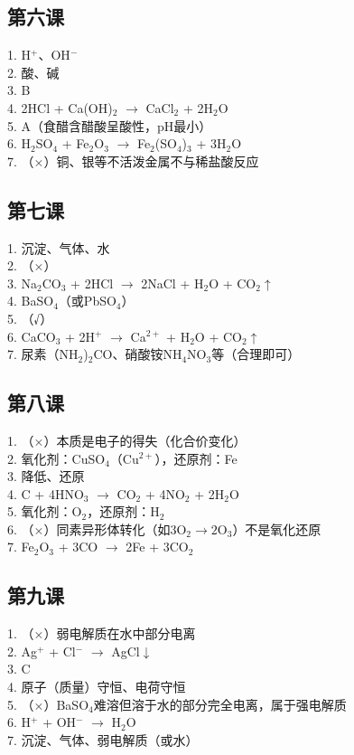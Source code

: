 \documentclass[a4paper,12pt]{ctexart}
\begin{document}
\subsection*{第六课}
1. H$^+$、OH$^-$\\
2. 酸、碱\\
3. B\\
4. 2HCl + Ca(OH)$_2$ $\rightarrow$ CaCl$_2$ + 2H$_2$O\\
5. A（食醋含醋酸呈酸性，pH最小）\\
6. H$_2$SO$_4$ + Fe$_2$O$_3$ $\rightarrow$ Fe$_2$(SO$_4$)$_3$ + 3H$_2$O\\
7. （×）铜、银等不活泼金属不与稀盐酸反应

\subsection*{第七课}
1. 沉淀、气体、水\\
2. （×）\\
3. Na$_2$CO$_3$ + 2HCl $\rightarrow$ 2NaCl + H$_2$O + CO$_2$$\uparrow$\\
4. BaSO$_4$（或PbSO$_4$）\\
5. （√）\\
6. CaCO$_3$ + 2H$^+$ $\rightarrow$ Ca$^{2+}$ + H$_2$O + CO$_2$$\uparrow$\\
7. 尿素（NH$_2$)$_2$CO、硝酸铵NH$_4$NO$_3$等（合理即可）

\subsection*{第八课}
1. （×）本质是电子的得失（化合价变化）\\
2. 氧化剂：CuSO$_4$（Cu$^{2+}$），还原剂：Fe\\
3. 降低、还原\\
4. C + 4HNO$_3$ $\rightarrow$ CO$_2$ + 4NO$_2$ + 2H$_2$O\\
5. 氧化剂：O$_2$，还原剂：H$_2$\\
6. （×）同素异形体转化（如$3\text{O}_2 \rightarrow 2\text{O}_3$）不是氧化还原\\
7. Fe$_2$O$_3$ + 3CO $\rightarrow$ 2Fe + 3CO$_2$

\subsection*{第九课}
1. （×）弱电解质在水中部分电离\\
2. Ag$^+$ + Cl$^-$ $\rightarrow$ AgCl$\downarrow$\\
3. C\\
4. 原子（质量）守恒、电荷守恒\\
5. （×）BaSO$_4$难溶但溶于水的部分完全电离，属于强电解质\\
6. H$^+$ + OH$^-$ $\rightarrow$ H$_2$O\\
7. 沉淀、气体、弱电解质（或水）
\end{document}
